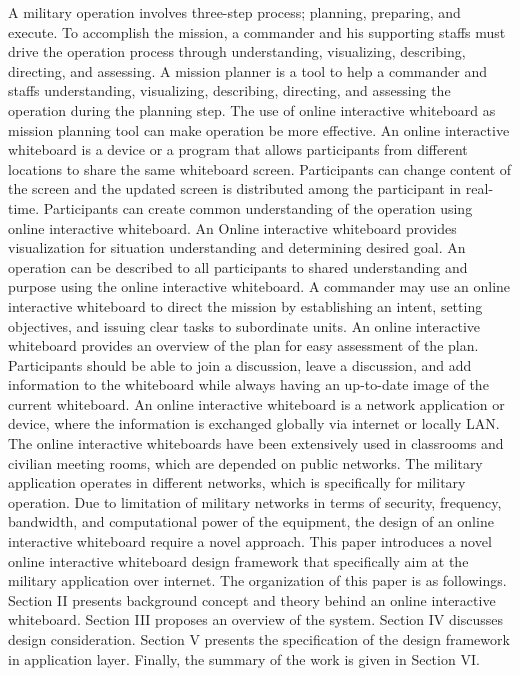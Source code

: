 \documentclass[conference]{IEEEtran}
\begin{document}
A military operation involves three-step process; planning, preparing, and execute. To accomplish the mission, a commander and his supporting staffs must drive the operation process through understanding, visualizing, describing, directing, and assessing. \cite{AA} A mission planner is a tool to help a commander and staffs understanding, visualizing, describing, directing, and assessing the operation during the planning step. The use of online interactive whiteboard as mission planning tool can make operation be more effective. An online interactive whiteboard is a device or a program that allows participants from different locations to share the same whiteboard screen. Participants can change content of the screen and the updated screen is distributed among the participant in real-time.   
Participants can create common understanding of the operation using online interactive whiteboard. An Online interactive whiteboard provides visualization for situation understanding and determining desired goal. An operation can be described to all participants to shared understanding and purpose using the online interactive whiteboard. A commander may use an online interactive whiteboard to direct the mission by establishing an intent, setting objectives, and issuing clear tasks to subordinate units. An online interactive whiteboard provides an overview of the plan for easy assessment of the plan. Participants should be able to join a discussion, leave a discussion, and add information to the whiteboard while always having an up-to-date image of the current whiteboard. 
An online interactive whiteboard is a network application or device, where the information is exchanged globally via internet or locally LAN. The online interactive whiteboards have been extensively used in classrooms and civilian meeting rooms, which are depended on public networks. The military application operates in different networks, which is specifically for military operation. Due to limitation of military networks in terms of security, frequency, bandwidth, and computational power of the equipment, the design of an online interactive whiteboard require a novel approach. 
This paper introduces a novel online interactive whiteboard design framework that specifically aim at the military application over internet. The organization of this paper is as followings. Section II presents background concept and theory behind an online interactive whiteboard. Section III proposes an overview of the system. Section IV discusses design consideration. Section V presents the specification of the design framework in application layer. Finally, the summary of the work is given in Section VI.
\end{document}
